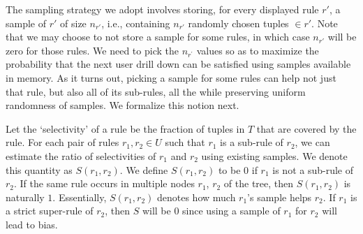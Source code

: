 {%

 The sampling strategy we adopt involves storing, 
for every displayed rule $r'$, a sample of $r'$ of size $n_{r'}$, i.e., 
containing $n_{r'}$ randomly chosen tuples $\in r'$.
Note that we may choose to not store a sample for some rules, in which case $n_{r'}$
will be zero for those rules. 
We need to pick the $n_{r^{\prime}}$ values so as to maximize the probability that the next user drill down can be satisfied using samples available in memory. 
As it turns out, picking a sample for some rules can help not just that rule, but
also all of its sub-rules, all the while preserving uniform randomness of samples. We formalize this notion next.


Let the `selectivity' of a rule be the fraction of tuples in $T$ that are covered by the rule. 
For each pair of rules $r_1, r_2 \in U$ such that $r_1$ is a sub-rule of $r_2$, we can estimate the ratio of selectivities of $r_1$ and $r_2$ using existing samples. We denote this quantity as $S(r_1, r_2)$. 
We define $S(r_1, r_2)$ to be $0$ if $r_1$ is not a sub-rule of $r_2$. 
If the same rule occurs in multiple nodes $r_1$, $r_2$ of the tree, then $S(r_1, r_2)$ is naturally $1$. 
Essentially, $S(r_1, r_2)$ denotes how much $r_1$'s sample helps $r_2$. 
If $r_1$ is a strict super-rule of $r_2$, then $S$ will be $0$ since using a sample of $r_1$
for $r_2$ will lead to bias.

}
